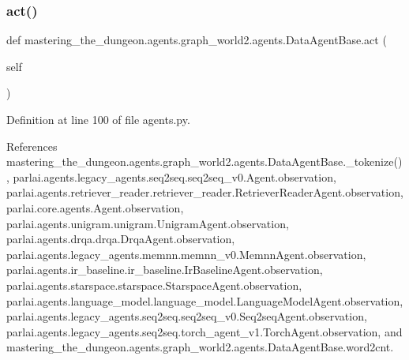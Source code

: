 \subsubsection{\texorpdfstring{act()}{act()}}
{\footnotesize\ttfamily def mastering\+\_\+the\+\_\+dungeon.\+agents.\+graph\+\_\+world2.\+agents.\+Data\+Agent\+Base.\+act (\begin{DoxyParamCaption}\item[{}]{self }\end{DoxyParamCaption})}



Definition at line 100 of file agents.\+py.



References mastering\+\_\+the\+\_\+dungeon.\+agents.\+graph\+\_\+world2.\+agents.\+Data\+Agent\+Base.\+\_\+tokenize(), parlai.\+agents.\+legacy\+\_\+agents.\+seq2seq.\+seq2seq\+\_\+v0.\+Agent.\+observation, parlai.\+agents.\+retriever\+\_\+reader.\+retriever\+\_\+reader.\+Retriever\+Reader\+Agent.\+observation, parlai.\+core.\+agents.\+Agent.\+observation, parlai.\+agents.\+unigram.\+unigram.\+Unigram\+Agent.\+observation, parlai.\+agents.\+drqa.\+drqa.\+Drqa\+Agent.\+observation, parlai.\+agents.\+legacy\+\_\+agents.\+memnn.\+memnn\+\_\+v0.\+Memnn\+Agent.\+observation, parlai.\+agents.\+ir\+\_\+baseline.\+ir\+\_\+baseline.\+Ir\+Baseline\+Agent.\+observation, parlai.\+agents.\+starspace.\+starspace.\+Starspace\+Agent.\+observation, parlai.\+agents.\+language\+\_\+model.\+language\+\_\+model.\+Language\+Model\+Agent.\+observation, parlai.\+agents.\+legacy\+\_\+agents.\+seq2seq.\+seq2seq\+\_\+v0.\+Seq2seq\+Agent.\+observation, parlai.\+agents.\+legacy\+\_\+agents.\+seq2seq.\+torch\+\_\+agent\+\_\+v1.\+Torch\+Agent.\+observation, and mastering\+\_\+the\+\_\+dungeon.\+agents.\+graph\+\_\+world2.\+agents.\+Data\+Agent\+Base.\+word2cnt.

